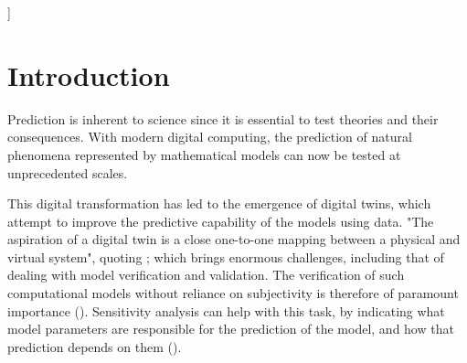 \documentclass[twocolumn]{rps-esrel2022}
\newcommand{\mda}[1]{\textcolor{blue}{#1}}
\begin{document}

]

\section{Introduction}
Prediction is inherent to science since it is essential to test theories and their consequences.
With modern digital computing, the prediction of natural phenomena represented by mathematical models can now be tested at unprecedented scales.

This digital transformation has led to the emergence of digital twins, which attempt to improve the predictive capability of the models using data.
"The aspiration of a digital twin is a close one-to-one mapping between a physical and virtual system", quoting \cite{wagg2020digital}; which brings enormous challenges, including that of dealing with model verification and validation.
The verification of such computational models without reliance on subjectivity is therefore of paramount importance (\cite{JRC122132}).
Sensitivity analysis can help with this task, by indicating what model parameters are responsible for the prediction of the model, and how that prediction depends on them (\cite{saltelli2004sensitivity}).
\end{document}
